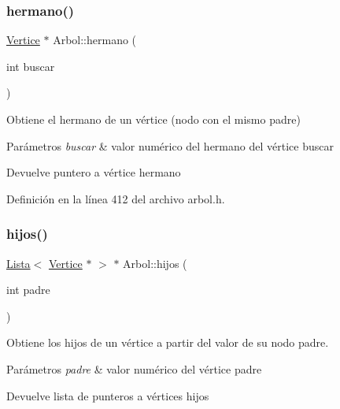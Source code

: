 \subsubsection{\texorpdfstring{hermano()}{hermano()}}
{\footnotesize\ttfamily \hyperlink{classVertice}{Vertice} $\ast$ Arbol\+::hermano (\begin{DoxyParamCaption}\item[{int}]{buscar }\end{DoxyParamCaption})}



Obtiene el hermano de un vértice (nodo con el mismo padre) 


\begin{DoxyParams}{Parámetros}
{\em buscar} & valor numérico del hermano del vértice buscar \\
\hline
\end{DoxyParams}
\begin{DoxyReturn}{Devuelve}
puntero a vértice hermano 
\end{DoxyReturn}


Definición en la línea 412 del archivo arbol.\+h.

\mbox{\label{classArbol_ac2bfb4e9bab05342fb7d627fe3916183}} 
\subsubsection{\texorpdfstring{hijos()}{hijos()}\hspace{0.1cm}{\footnotesize\ttfamily [1/2]}}
{\footnotesize\ttfamily \hyperlink{classLista}{Lista}$<$ \hyperlink{classVertice}{Vertice} $\ast$ $>$ $\ast$ Arbol\+::hijos (\begin{DoxyParamCaption}\item[{int}]{padre }\end{DoxyParamCaption})}



Obtiene los hijos de un vértice a partir del valor de su nodo padre. 


\begin{DoxyParams}{Parámetros}
{\em padre} & valor numérico del vértice padre \\
\hline
\end{DoxyParams}
\begin{DoxyReturn}{Devuelve}
lista de punteros a vértices hijos 
\end{DoxyReturn}



